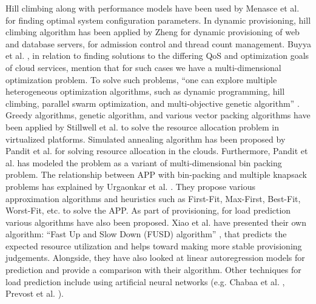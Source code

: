 \documentclass[10pt,journal,cspaper,compsoc]{IEEEtran}
\begin{document}
Hill climbing along with performance models have been used by Menasce et al. \cite{menasce2003automatic8} for finding optimal system configuration parameters. In dynamic provisioning, hill climbing algorithm has been applied by Zheng \cite{zheng2007model9} for dynamic provisioning of web and database servers, for admission control and thread count management. Buyya et al. \cite{2010_Buyya_InterCloud}, in relation to finding solutions to the differing QoS and optimization goals of cloud services, mention that for such cases we have a multi-dimensional optimization problem. To solve such problems, ``one can explore multiple heterogeneous optimization algorithms, such as dynamic programming, hill climbing, parallel swarm optimization, and multi-objective genetic algorithm'' \cite[p.~22]{2010_Buyya_InterCloud}. Greedy algorithms, genetic algorithm, and various vector packing algorithms have been applied by Stillwell et al. \cite{2010_ResourceAllocationAlgorithms} to solve the resource allocation problem in virtualized platforms. Simulated annealing algorithm has been proposed by Pandit et al. \cite{2014_ResourceAllocSimAnnealing} for solving resource allocation in the clouds. Furthermore, Pandit et al. \cite{2014_ResourceAllocSimAnnealing} has modeled the problem as a variant of multi-dimensional bin packing problem. The relationship between APP with bin-packing and multiple knapsack problems has explained by Urgaonkar et al. \cite{2007_Urgaonkar_APP}. They propose various approximation algorithms and heuristics such as First-Fit, Max-First, Best-Fit, Worst-Fit, etc. to solve the APP. As part of provisioning, for load prediction various algorithms have also been proposed. Xiao et al. \cite{2013_Xiao_DynResAllocationVM} have presented their own algorithm: ``Fast Up and Slow Down (FUSD) algorithm'' \cite{2013_Xiao_DynResAllocationVM}, that predicts the expected resource utilization and helps toward making more stable provisioning judgements. Alongside, they have also looked at linear autoregression models for prediction and provide a comparison with their algorithm. Other techniques for load prediction include using artificial neural networks (e.g. Chabaa et al. \cite{2010_IdentPredictInternetTraffic}, Prevost et al. \cite{2011_PredictionCloudNN}).
\end{document}

